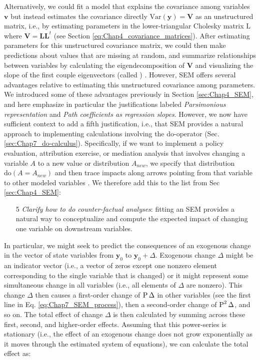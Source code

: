 Alternatively, we could fit a model that explains the covariance among variables \(\mathbf{v}\) but instead estimates the covariance directly \(\mathrm{Var}(\mathbf{y}) = \mathbf{V}\) as an unstructured matrix, i.e., by estimating parameters in the lower-triangular Cholesky matrix \(\mathrm{L}\) where \(\mathbf{V = LL}^t\) (see Section \ref{eq:Chap4_covariance_matrices}). After estimating parameters for this unstructured covariance matrix, we could then make predictions about values that are missing at random, and summarize relationships between variables by calculating the eigendecomposition of \(\mathbf{V}\) and visualizing the slope of the first couple eigenvectors (called ) \cite{thorson_predicting_2017, warton_bivariate_2006}.  However, SEM offers several advantages relative to estimating this unstructured covariance among parameters.  We introduced some of these advantages previously in Section \ref{sec:Chap4_SEM}, and here emphasize in particular the justifications labeled \textit{Parsimonious representation} and \textit{Path coefficients as regression slopes}.  However, we now have sufficient context to add a fifth justification, i.e., that SEM provides a natural approach to implementing calculations involving the do-operator (Sec. \ref{sec:Chap7_do-calculus}).  Specifically, if we want to implement a policy evaluation, attribution exercise, or mediation analysis that involves changing a variable \(A\) to a new value or distribution \(A_{new}\), we specify that distribution \( \mathrm{do}(A=A_{new}) \) and then trace impacts along arrows pointing from that variable to other modeled variables \cite{pearl_causal_2009,wright_method_1934}.  We therefore add this to the list from Sec \ref{sec:Chap4_SEM}:
\begin{enumerate}
    \item[5] \textit{Clarify how to do counter-factual analyses}:  fitting an SEM provides a natural way to conceptualize and compute the expected impact of changing one variable on downstream variables.   
\end{enumerate}
In particular, we might seek to predict the consequences of an exogenous change in the vector of state variables from \(\mathbf{y}_0\) to \(\mathbf{y}_0 + \Delta\).  Exogenous change \(\Delta\) might be an indicator vector (i.e., a vector of zeros except one nonzero element corresponding to the single variable that is changed) or it might represent some simultaneous change in all variables (i.e., all elements of \(\Delta\) are nonzero).  This change \(\Delta\) then causes a first-order change of \(\operatorname{P} \Delta\) in other variables (see the first line in Eq. \ref{eq:Chap7_SEM_process}), then a second-order change of \(\operatorname{P}^2 \Delta\), and so on.  The total effect of change \(\Delta\) is then calculated by summing across these first, second, and higher-order effects.  Assuming that this power-series is stationary (i.e., the effect of an exogenous change does not grow exponentially as it moves through the estimated system of equations), we can calculate the total effect as:

